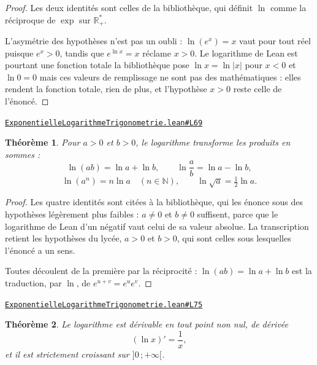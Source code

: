 \documentclass[11pt,a4paper]{article}
\theoremstyle{definition}
\theoremstyle{plain}
\newtheorem{theoreme}{Théorème}
\newcommand{\source}[2]{\par\smallskip\noindent\hfill{\footnotesize\href{#1}{\texttt{#2}}}\par\smallskip}
\begin{document}
\begin{proof}
Les deux identités sont celles de la bibliothèque, qui définit $\ln$ comme la réciproque de
$\exp$ sur $\mathbb{R}_{+}^{*}$.

\medskip\noindent
L'asymétrie des hypothèses n'est pas un oubli : $\ln(e^{x}) = x$ vaut pour tout réel
puisque $e^{x} > 0$, tandis que $e^{\ln x} = x$ réclame $x > 0$. Le logarithme de Lean est
pourtant une fonction totale \textemdash{} la bibliothèque pose $\ln x = \ln|x|$ pour
$x < 0$ et $\ln 0 = 0$ \textemdash{} mais ces valeurs de remplissage ne sont pas des
mathématiques : elles rendent la fonction totale, rien de plus, et l'hypothèse $x > 0$ reste
celle de l'énoncé.
\end{proof}
\source{https://github.com/Commutator-IO/learn-lean/blob/main/cours/02-lycee/05-exponentielle-logarithme-trigonometrie/ExponentielleLogarithmeTrigonometrie.lean\#L69}{ExponentielleLogarithmeTrigonometrie.lean\#L69}

\begin{theoreme}
Pour $a > 0$ et $b > 0$, le logarithme transforme les produits en sommes :
\[ \ln(ab) = \ln a + \ln b, \qquad \ln\frac{a}{b} = \ln a - \ln b, \]
\[ \ln(a^{n}) = n \ln a \quad (n \in \mathbb{N}), \qquad
   \ln\sqrt{a} = \tfrac{1}{2}\ln a . \]
\end{theoreme}

\begin{proof}
Les quatre identités sont citées à la bibliothèque, qui les énonce sous des hypothèses
légèrement plus faibles : $a \ne 0$ et $b \ne 0$ suffisent, parce que le logarithme de Lean
d'un négatif vaut celui de sa valeur absolue. La transcription retient les hypothèses du
lycée, $a > 0$ et $b > 0$, qui sont celles sous lesquelles l'énoncé a un sens.

\medskip\noindent
Toutes découlent de la première par la réciprocité : $\ln(ab) = \ln a + \ln b$ est la
traduction, par $\ln$, de $e^{u+v} = e^{u}e^{v}$.
\end{proof}
\source{https://github.com/Commutator-IO/learn-lean/blob/main/cours/02-lycee/05-exponentielle-logarithme-trigonometrie/ExponentielleLogarithmeTrigonometrie.lean\#L75}{ExponentielleLogarithmeTrigonometrie.lean\#L75}

\begin{theoreme}
Le logarithme est dérivable en tout point non nul, de dérivée
\[ (\ln x)' = \frac{1}{x} , \]
et il est strictement croissant sur $]0\,;+\infty[$.
\end{theoreme}
\end{document}
